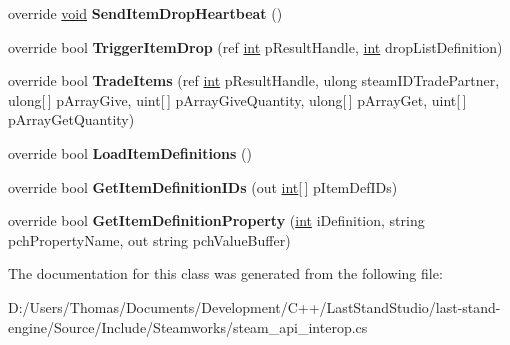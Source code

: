 \begin{DoxyCompactItemize}
\item 
\hypertarget{classValve_1_1Steamworks_1_1CSteamInventory_a8095766c2ec2f5b748b81603c6ccfc7e}{}override \hyperlink{SDL__audio_8h_a52835ae37c4bb905b903cbaf5d04b05f}{void} {\bfseries Send\+Item\+Drop\+Heartbeat} ()\label{classValve_1_1Steamworks_1_1CSteamInventory_a8095766c2ec2f5b748b81603c6ccfc7e}

\item 
\hypertarget{classValve_1_1Steamworks_1_1CSteamInventory_aec41432bde7698173cb0037782a426ff}{}override bool {\bfseries Trigger\+Item\+Drop} (ref \hyperlink{SDL__thread_8h_a6a64f9be4433e4de6e2f2f548cf3c08e}{int} p\+Result\+Handle, \hyperlink{SDL__thread_8h_a6a64f9be4433e4de6e2f2f548cf3c08e}{int} drop\+List\+Definition)\label{classValve_1_1Steamworks_1_1CSteamInventory_aec41432bde7698173cb0037782a426ff}

\item 
\hypertarget{classValve_1_1Steamworks_1_1CSteamInventory_a65ddc023ddbaaefae6e044a7e1471538}{}override bool {\bfseries Trade\+Items} (ref \hyperlink{SDL__thread_8h_a6a64f9be4433e4de6e2f2f548cf3c08e}{int} p\+Result\+Handle, ulong steam\+I\+D\+Trade\+Partner, ulong\mbox{[}$\,$\mbox{]} p\+Array\+Give, uint\mbox{[}$\,$\mbox{]} p\+Array\+Give\+Quantity, ulong\mbox{[}$\,$\mbox{]} p\+Array\+Get, uint\mbox{[}$\,$\mbox{]} p\+Array\+Get\+Quantity)\label{classValve_1_1Steamworks_1_1CSteamInventory_a65ddc023ddbaaefae6e044a7e1471538}

\item 
\hypertarget{classValve_1_1Steamworks_1_1CSteamInventory_acf3ea0d1322f37e586c130cac6bdf709}{}override bool {\bfseries Load\+Item\+Definitions} ()\label{classValve_1_1Steamworks_1_1CSteamInventory_acf3ea0d1322f37e586c130cac6bdf709}

\item 
\hypertarget{classValve_1_1Steamworks_1_1CSteamInventory_a0439dc10ab8d2bdc8f9cb3c9e93ee10c}{}override bool {\bfseries Get\+Item\+Definition\+I\+Ds} (out \hyperlink{SDL__thread_8h_a6a64f9be4433e4de6e2f2f548cf3c08e}{int}\mbox{[}$\,$\mbox{]} p\+Item\+Def\+I\+Ds)\label{classValve_1_1Steamworks_1_1CSteamInventory_a0439dc10ab8d2bdc8f9cb3c9e93ee10c}

\item 
\hypertarget{classValve_1_1Steamworks_1_1CSteamInventory_a1f499004569219f8a32d2415f129e2de}{}override bool {\bfseries Get\+Item\+Definition\+Property} (\hyperlink{SDL__thread_8h_a6a64f9be4433e4de6e2f2f548cf3c08e}{int} i\+Definition, string pch\+Property\+Name, out string pch\+Value\+Buffer)\label{classValve_1_1Steamworks_1_1CSteamInventory_a1f499004569219f8a32d2415f129e2de}

\end{DoxyCompactItemize}


The documentation for this class was generated from the following file\+:\begin{DoxyCompactItemize}
\item 
D\+:/\+Users/\+Thomas/\+Documents/\+Development/\+C++/\+Last\+Stand\+Studio/last-\/stand-\/engine/\+Source/\+Include/\+Steamworks/steam\+\_\+api\+\_\+interop.\+cs\end{DoxyCompactItemize}
